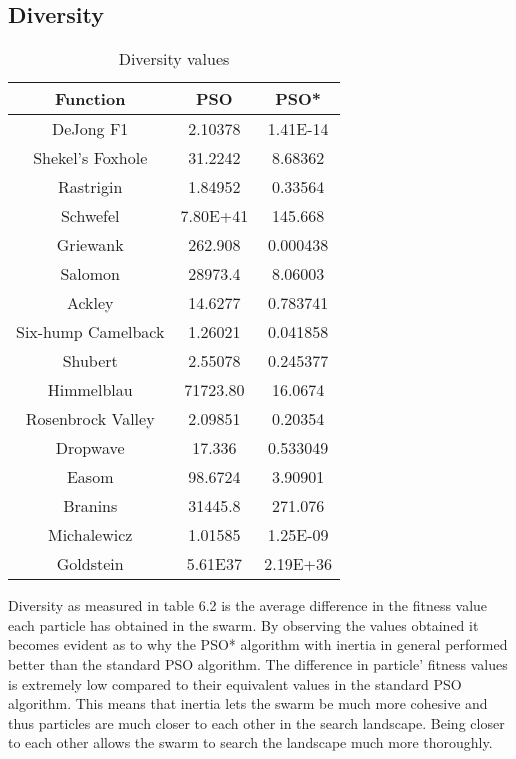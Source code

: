 \subsection{Diversity}
\begin{table}[h]
\label{tbl:diversityValues}
\begin{center}
	\begin{tabular}{| c | c | c |}
	\hline
	Function & PSO & PSO*\\  \hline
	DeJong F1 & 2.10378 & 1.41E-14 \\ \hline
	Shekel's Foxhole & 31.2242 & 8.68362 \\ \hline
	Rastrigin & 1.84952 & 0.33564 \\ \hline
	Schwefel & 7.80E+41  & 145.668\\ \hline
	Griewank & 262.908 & 0.000438 \\ \hline
	Salomon & 28973.4  & 8.06003\\ \hline
	Ackley & 14.6277  & 0.783741\\ \hline
	Six-hump Camelback & 1.26021  & 0.041858\\ \hline
	Shubert & 2.55078  & 0.245377\\ \hline
	Himmelblau & 71723.80 & 16.0674\\ \hline
	Rosenbrock Valley & 2.09851  & 0.20354\\ \hline
	Dropwave & 17.336 & 0.533049\\ \hline
	Easom & 98.6724 & 3.90901\\ \hline
	Branins & 31445.8 & 271.076\\ \hline
	Michalewicz & 1.01585 & 1.25E-09\\ \hline
	Goldstein & 5.61E37 & 2.19E+36\\ \hline
	\end{tabular}
\end{center}
\caption{Diversity values}
\end{table}
Diversity as measured in table 6.2 is the average difference in the fitness value each particle has obtained in the swarm. By observing the values obtained it becomes evident as to why the PSO* algorithm with inertia in general performed better than the standard PSO algorithm. The difference in particle' fitness values is extremely low compared to their equivalent values in the standard PSO algorithm. This means that inertia lets the swarm be much more cohesive and thus particles are much closer to each other in the search landscape. Being closer to each other allows the swarm to search the landscape much more thoroughly.

